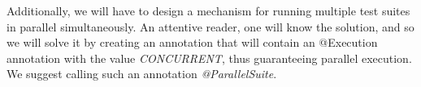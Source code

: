 Additionally, we will have to design a mechanism for running multiple test suites in parallel simultaneously.
An attentive reader, one will know the solution, and so we will solve it by creating an annotation that will contain an @Execution annotation with the value \emph{CONCURRENT}, thus guaranteeing parallel execution.
We suggest calling such an annotation \emph{@ParallelSuite}.

